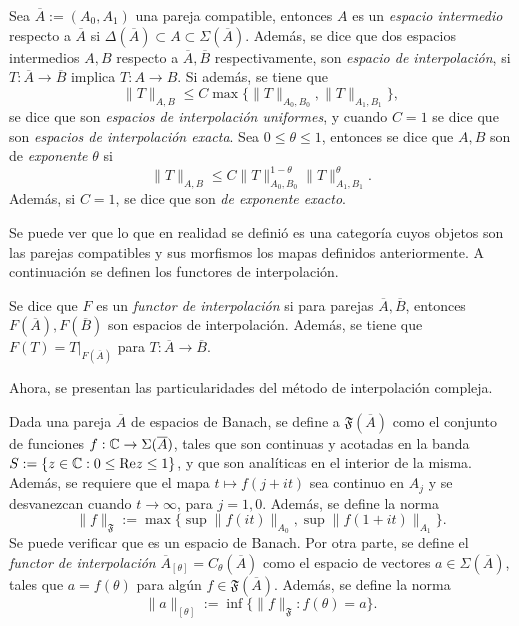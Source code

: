 \begin{definition}
	Sea $\overline{A}:=(A_0, A_1)$ una pareja compatible, entonces $A$ es un \textit{espacio intermedio} respecto a $\overline{A}$ si $\Delta(\overline{A}) \subset A \subset \Sigma(\overline{A})$. Además, se dice que dos espacios intermedios $A, B$ respecto a $\overline{A},\overline{B}$ respectivamente, son \textit{espacio de interpolación}, si  $T:\overline{A}\to\overline{B}$ implica $T:A\to B$. Si además, se tiene que 
	\begin{equation*}
		\|T\|_{A, B} \leq C \max\{\|T\|_{A_0, B_0}, \|T\|_{A_1, B_1}\},
	\end{equation*}
	se dice que son \textit{espacios de interpolación uniformes}, y cuando $C=1$ se dice que son \textit{espacios de interpolación exacta}. Sea $0\leq\theta\leq1$, entonces se dice que $A, B$ son de \textit{exponente} $\theta$ si 
	\begin{equation*}
		\|T\|_{A, B} \leq C \|T\|_{A_0, B_0}^{1-\theta} \|T\|_{A_1, B_1}^{\theta}.
	\end{equation*}
	Además, si $C=1$, se dice que son \textit{de exponente exacto}.
\end{definition}
\begin{remark}
	Se puede ver que lo que en realidad se definió es una categoría cuyos objetos son las parejas compatibles y sus morfismos los mapas definidos anteriormente. A continuación se definen los functores de interpolación.
\end{remark}
\begin{definition}
	Se dice que $F$ es un \textit{functor de interpolación} si para parejas $\overline{A}, \overline{B}$, entonces $F(\overline{A}), F(\overline{B})$ son espacios de interpolación. Además, se tiene que $F(T)=T\vert_{F(\overline{A})}$ para $T:\overline{A}\to\overline{B}$.
\end{definition}
Ahora, se presentan las particularidades del método de interpolación compleja.
\begin{definition}
	Dada una pareja $\overline{A}$ de espacios de Banach, se define a $\mathfrak{F}(\overline{A})$ como el conjunto de funciones $f:\mathbb{C}\to\Sigma(\overline{A})$, tales que son continuas y acotadas en la banda $S:=\{z\in\mathbb{C} : 0\leq\mathrm{Re} z\leq1\}$, y que son analíticas en el interior de la misma. Además, se requiere que el mapa $t\mapsto f(j+it)$ sea continuo en $A_j$ y se desvanezcan cuando $t\to\infty$, para $j=1,0$. Además, se define la norma 
	\begin{equation*}
		\|f\|_{\mathfrak{F}} := \max\{\sup\|f(it)\|_{A_0}, \sup\|f(1+it)\|_{A_1}\}.
	\end{equation*}
	Se puede verificar que es un espacio de Banach. Por otra parte, se define el \textit{functor de interpolación} $\overline{A}_{[\theta]}=C_\theta(\overline{A})$ como el espacio de vectores $a\in\Sigma(\overline{A})$, tales que $a=f(\theta)$ para algún $f\in \mathfrak{F}(\overline{A})$. Además, se define la norma
	\begin{equation*}
		\|a\|_{[\theta]} := \inf \{\|f\|_{\mathfrak{F}} : f(\theta) = a\}.
	\end{equation*}
\end{definition}
